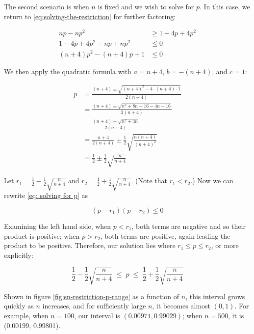 \documentclass{article}
\begin{document}
The second scenario is when $n$ is fixed and we wish to solve for $p$. In this
case, we return to \eqref{eq:solving-the-restriction} for further factoring:

\begin{align}
  np - np^2 &\geq 1 - 4p + 4p^2 \nonumber \\
  1 - 4p + 4p^2 - np + np^2 &\leq 0 \nonumber \\
  (n+4)p^2 - (n+4)p + 1 &\leq 0 \label{eq: solving for p}
\end{align}

We then apply the quadratic formula with $a = n+4$, $b = -(n+4)$, and $c = 1$:

\begin{align*}
  p &= \frac{(n+4) \pm \sqrt{(n+4)^2 - 4 \cdot (n+4) \cdot 1}}{2(n+4)} \\
  &= \frac{(n+4) \pm \sqrt{n^2 + 8n + 16 - 4n - 16}}{2(n+4)} \\
  &= \frac{(n+4) \pm \sqrt{n^2 + 4n}}{2(n+4)} \\
  &= \frac{n+4}{2(n+4)} \pm \frac12 \sqrt{\frac{n(n+4)}{(n+4)^2}} \\
  &= \frac12 \pm \frac12 \sqrt{\frac{n}{n+4}}
\end{align*}

Let $r_1 = \frac12 - \frac12 \sqrt{\frac{n}{n+4}}$ and $r_2 = \frac12 + \frac12
\sqrt{\frac{n}{n+4}}$. (Note that $r_1 < r_2$.) Now we can rewrite \eqref{eq:
solving for p} as

\begin{equation*}
  (p - r_1)(p - r_2) \leq 0
\end{equation*}

Examining the left hand side, when $p < r_1$, both terms are negative and so
their product is positive; when $p > r_2$, both terms are positive, again
leading the product to be positive. Therefore, our solution lies where $r_1
\leq p \leq r_2$, or more explicitly:

\begin{equation}
 \frac12 - \frac12 \sqrt{\frac{n}{n+4}} \; \leq \; p \; \leq \; \frac12 + \frac12 \sqrt{\frac{n}{n+4}}
\end{equation}

Shown in figure \ref{fig:sn-restriction-p-range} as a function of $n$, this
interval grows quickly as $n$ increases, and for sufficiently large $n$, it
becomes almost $(0, 1)$. For example, when $n=100$, our interval is $(0.00971,
0.99029)$; when $n=500$, it is (0.00199, 0.99801).
\end{document}
